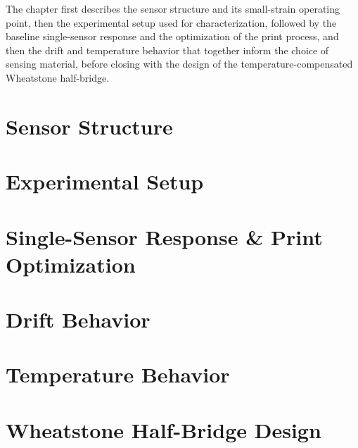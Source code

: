 The chapter first describes the sensor structure and its small-strain operating point, then the experimental setup used for characterization, followed by the baseline single-sensor response and the optimization of the print process, and then the drift and temperature behavior that together inform the choice of sensing material, before closing with the design of the temperature-compensated Wheatstone half-bridge.

\section{Sensor Structure}\label{Sensor Structure & the Small-Strain Operating Point}


\section{Experimental Setup}\label{Experimental Setup}


\section{Single-Sensor Response \& Print Optimization}\label{Baseline Single-Sensor Response}


\section{Drift Behavior}\label{Material & Mounting-Surface Selection (Drift)}


\section{Temperature Behavior}\label{Temperature Behaviour}


\section{Wheatstone Half-Bridge Design}\label{Wheatstone Half-Bridge Design}
